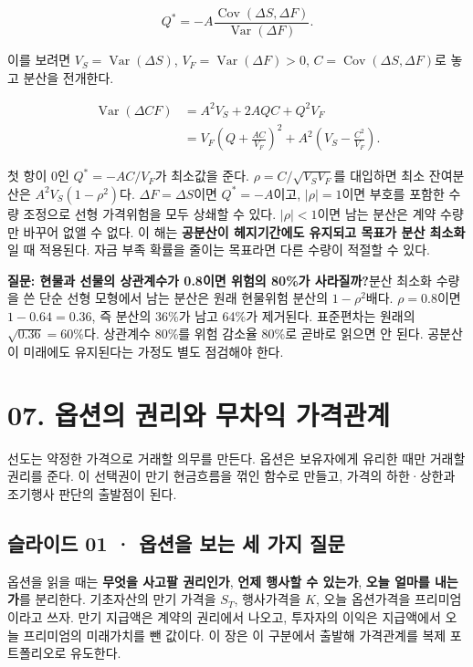 \documentclass[11pt,a4paper]{article}
\begin{document}
\[
Q^*=-A\frac{\operatorname{Cov}(\Delta S,\Delta F)}{\operatorname{Var}(\Delta F)}.
\]

이를 보려면 $V_S=\operatorname{Var}(\Delta S)$, $V_F=\operatorname{Var}(\Delta F)>0$, $C=\operatorname{Cov}(\Delta S,\Delta F)$로 놓고 분산을 전개한다.\par

\[
\begin{aligned}
\operatorname{Var}(\Delta CF)
&=A^2V_S+2AQC+Q^2V_F\\
&=V_F\left(Q+\frac{AC}{V_F}\right)^2
  +A^2\left(V_S-\frac{C^2}{V_F}\right).
\end{aligned}
\]

첫 항이 0인 $Q^*=-AC/V_F$가 최소값을 준다. $\rho=C/\sqrt{V_SV_F}$를 대입하면 최소 잔여분산은 $A^2V_S(1-\rho^2)$다. $\Delta F=\Delta S$이면 $Q^*=-A$이고, $|\rho|=1$이면 부호를 포함한 수량 조정으로 선형 가격위험을 모두 상쇄할 수 있다. $|\rho|<1$이면 남는 분산은 계약 수량만 바꾸어 없앨 수 없다. 이 해는 \textbf{공분산이 헤지기간에도 유지되고 목표가 분산 최소화}일 때 적용된다. 자금 부족 확률을 줄이는 목표라면 다른 수량이 적절할 수 있다.\par

\par\medskip\noindent\textbf{질문: 현물과 선물의 상관계수가 0.8이면 위험의 80\%가 사라질까?}\quad 분산 최소화 수량을 쓴 단순 선형 모형에서 남는 분산은 원래 현물위험 분산의 $1-\rho^2$배다. $\rho=0.8$이면 $1-0.64=0.36$, 즉 분산의 36\%가 남고 64\%가 제거된다. 표준편차는 원래의 $\sqrt{0.36}=60\%$다. 상관계수 80\%를 위험 감소율 80\%로 곧바로 읽으면 안 된다. 공분산이 미래에도 유지된다는 가정도 별도 점검해야 한다.\par

\section{07. 옵션의 권리와 무차익 가격관계}
선도는 약정한 가격으로 거래할 의무를 만든다. 옵션은 보유자에게 유리한 때만 거래할 권리를 준다. 이 선택권이 만기 현금흐름을 꺾인 함수로 만들고, 가격의 하한·상한과 조기행사 판단의 출발점이 된다.\par

\subsection{슬라이드 01 · 옵션을 보는 세 가지 질문}
옵션을 읽을 때는 \textbf{무엇을 사고팔 권리인가}, \textbf{언제 행사할 수 있는가}, \textbf{오늘 얼마를 내는가}를 분리한다. 기초자산의 만기 가격을 $S_T$, 행사가격을 $K$, 오늘 옵션가격을 프리미엄이라고 쓰자. 만기 지급액은 계약의 권리에서 나오고, 투자자의 이익은 지급액에서 오늘 프리미엄의 미래가치를 뺀 값이다. 이 장은 이 구분에서 출발해 가격관계를 복제 포트폴리오로 유도한다.\par
\end{document}
